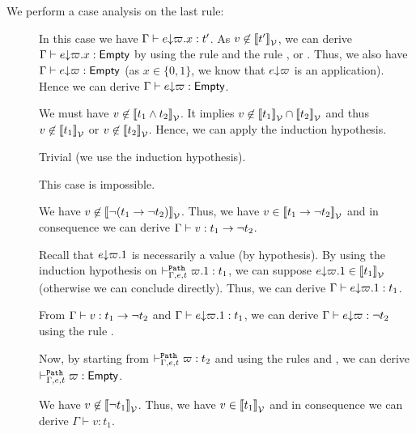 \documentclass[a4paper]{article}
\theoremstyle{definition}
\begin{document}
        We perform a case analysis on the last rule:
        \begin{description}
          \item[] In this case we have $\Gamma \vdash e{\downarrow}\varpi.x : t'$. As $v \not\in {\llbracket t' \rrbracket}_{\mathcal{V}}$,
          we can derive $\Gamma \vdash e{\downarrow}\varpi.x : \textsf{Empty}$ by using the rule  and the rule ,  or .
          Thus, we also have $\Gamma \vdash e{\downarrow}\varpi : \textsf{Empty}$ (as $x\in\{0,1\}$, we know that $e{\downarrow}\varpi$ is an application).
          Hence we can derive $\Gamma \vdash e{\downarrow}\varpi : \textsf{Empty}$.
          \item[] We must have $v \not\in {\llbracket t_1 \land t_2 \rrbracket}_{\mathcal{V}}$. It implies $v \not\in {\llbracket t_1 \rrbracket}_{\mathcal{V}} \cap {\llbracket t_2 \rrbracket}_{\mathcal{V}}$
          and thus $v \not\in {\llbracket t_1 \rrbracket}_{\mathcal{V}}$ or $v \not\in {\llbracket t_2 \rrbracket}_{\mathcal{V}}$. Hence, we can apply the induction hypothesis.
          \item[] Trivial (we use the induction hypothesis).
          \item[] This case is impossible.
          \item[] We have $v \not\in {\llbracket \neg (t_1\to \neg t_2) \rrbracket}_{\mathcal{V}}$. Thus, we have $v \in {\llbracket t_1\to \neg t_2 \rrbracket}_{\mathcal{V}}$
          and in consequence we can derive $\Gamma \vdash v:t_1\to \neg t_2$.

          Recall that $e{\downarrow}\varpi.1$ is necessarily a value (by hypothesis).
          By using the induction hypothesis on $\vdash^{\texttt{Path}}_{\Gamma,e,t} \varpi.1:t_1$, we can suppose $e{\downarrow}\varpi.1 \in {\llbracket t_1 \rrbracket}_{\mathcal{V}}$ (otherwise we can conclude directly).
          Thus, we can derive $\Gamma \vdash e{\downarrow}\varpi.1: t_1$.

          From $\Gamma \vdash v:t_1\to \neg t_2$ and $\Gamma \vdash e{\downarrow}\varpi.1: t_1$, we can derive $\Gamma \vdash e{\downarrow}\varpi: \neg t_2$
          using the rule .

          Now, by starting from $\vdash^{\texttt{Path}}_{\Gamma,e,t} \varpi:t_2$ and using the rules  and , we can derive
          $\vdash^{\texttt{Path}}_{\Gamma,e,t} \varpi:\textsf{Empty}$.
        
          \item[] We have $v \not\in {\llbracket \neg t_1 \rrbracket}_{\mathcal{V}}$. Thus, we have $v \in {\llbracket t_1 \rrbracket}_{\mathcal{V}}$ and in consequence
          we can derive $\Gamma \vdash v:t_1$. 


\end{description}
\end{document}
